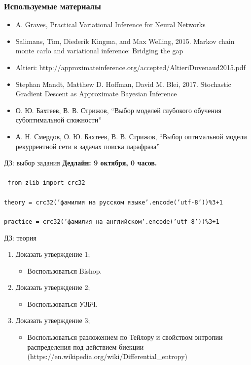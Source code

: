 \documentclass[usenames,dvipsnames,10pt,pdf,utf8,russian,aspectratio=43]{beamer}
\begin{document}
\begin{frame}
\frametitle{Используемые материалы}
\begin{itemize}
\item A. Graves, Practical Variational Inference for Neural Networks
\item Salimans, Tim, Diederik Kingma, and Max Welling, 2015. Markov chain monte carlo and variational inference: Bridging the gap
\item Altieri: http://approximateinference.org/accepted/AltieriDuvenaud2015.pdf
\item Stephan Mandt, Matthew D. Hoffman, David M. Blei, 2017. Stochastic Gradient Descent as Approximate Bayesian Inference
\item О. Ю. Бахтеев, В. В. Стрижов, “Выбор моделей глубокого обучения субоптимальной сложности”
\item А. Н. Смердов, О. Ю. Бахтеев, В. В. Стрижов, “Выбор оптимальной модели рекуррентной сети в задачах поиска парафраза”
\end{itemize}
\end{frame}

\begin{frame}{ДЗ: выбор задания}
\textbf{Дедлайн: 9 октября, 0 часов.}\\~\\

\texttt{ from zlib import crc32}\\~\\
\texttt{theory = crc32('фамилия на русском языке'.encode('utf-8'))\%3+1}\\~\\
\texttt{practice = crc32('фамилия на английском'.encode('utf-8'))\%3+1}
\end{frame}

\begin{frame}{ДЗ: теория}
\begin{enumerate}
\item Доказать утверждение 1;
\begin{itemize}
\item Воспользоваться Bishop.
\end{itemize}

\item Доказать утверждение 2;
\begin{itemize}
\item Воспользоваться УЗБЧ.
\end{itemize}

\item Доказать утверждение 3;
\begin{itemize}
\item Воспользоваться разложением по Тейлору и свойством энтропии распределения под действием биекции (https://en.wikipedia.org/wiki/Differential\_entropy)
\end{itemize}
\end{enumerate}
\end{frame}
\end{document}
